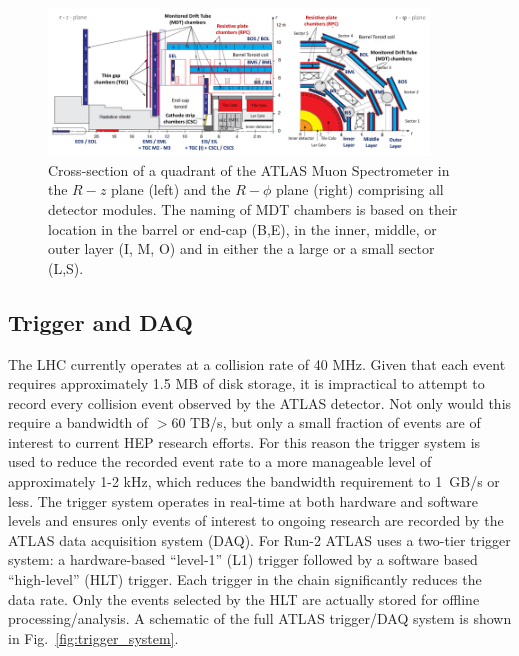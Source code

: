 \begin{figure}
	\centering
	\includegraphics[width=0.9\textwidth]{muon_spectrometer_quadrant}
	\caption{
	 Cross-section of a quadrant of the ATLAS Muon Spectrometer \cite{kuger2017signal} in the $R-z$ plane (left) and the $R-\phi$ plane (right) comprising all detector modules. The naming of MDT chambers is based on their location in the barrel or end-cap (B,E), in the inner, middle, or outer layer (I, M, O) and in either the a large or a small sector (L,S).
	}
\end{figure}

% 
\subsection{Trigger and DAQ}
The LHC currently operates at a collision rate of 40 MHz.
Given that each event requires approximately 1.5 MB of disk storage, it is impractical to attempt to record every collision event observed by the ATLAS detector.
Not only would this require a bandwidth of $> 60$ TB/s, but only a small fraction of events are of interest to current HEP research efforts.
For this reason the trigger system \cite{Ruiz-Martinez:2133909} is used to reduce the recorded event rate to a more manageable level of approximately 1-2 kHz, which reduces the bandwidth requirement to 1~GB/s or less.
The trigger system operates in real-time at both hardware and software levels and ensures only events of interest to ongoing research are recorded by the ATLAS data acquisition system (DAQ).
For Run-2 ATLAS uses a two-tier trigger system: a hardware-based ``level-1'' (L1) trigger followed by a software based ``high-level'' (HLT) trigger.
Each trigger in the chain significantly reduces the data rate.
Only the events selected by the HLT are actually stored for offline processing/analysis.
A schematic of the full ATLAS trigger/DAQ system is shown in Fig.~\ref{fig:trigger_system}.

